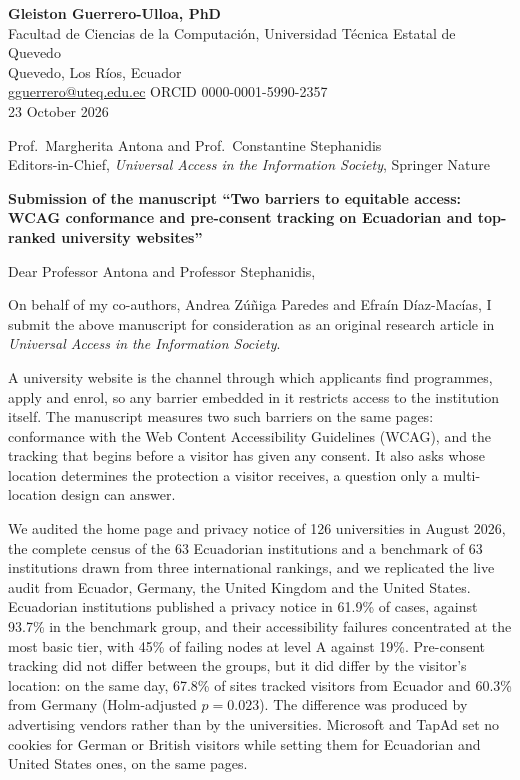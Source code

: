 \documentclass[11pt,a4paper]{article}
\begin{document}
\begin{flushright}
	\small
	{\color{uteq}\textbf{Gleiston Guerrero-Ulloa, PhD}}\\
	Facultad de Ciencias de la Computaci\'on, Universidad T\'ecnica Estatal de Quevedo\\
	Quevedo, Los R\'ios, Ecuador\\
	\href{mailto:gguerrero@uteq.edu.ec}{gguerrero@uteq.edu.ec} \quad ORCID 0000-0001-5990-2357\\[0.5em]
	23 October 2026
\end{flushright}

\vspace{0.1em}
Prof.\ Margherita Antona and Prof.\ Constantine Stephanidis\\
Editors-in-Chief, \textit{Universal Access in the Information Society}, Springer Nature

\vspace{0.1em}
\textbf{Submission of the manuscript ``Two barriers to equitable access: WCAG conformance and pre-consent tracking on Ecuadorian and top-ranked university websites''}

Dear Professor Antona and Professor Stephanidis,

On behalf of my co-authors, Andrea Z\'u\~niga Paredes and Efra\'in D\'iaz-Mac\'ias, I submit the above manuscript for consideration as an original research article in \textit{Universal Access in the Information Society}.

A university website is the channel through which applicants find programmes, apply and enrol, so any barrier embedded in it restricts access to the institution itself. The manuscript measures two such barriers on the same pages: conformance with the Web Content Accessibility Guidelines (WCAG), and the tracking that begins before a visitor has given any consent. It also asks whose location determines the protection a visitor receives, a question only a multi-location design can answer.

We audited the home page and privacy notice of 126 universities in August 2026, the complete census of the 63 Ecuadorian institutions and a benchmark of 63 institutions drawn from three international rankings, and we replicated the live audit from Ecuador, Germany, the United Kingdom and the United States. Ecuadorian institutions published a privacy notice in 61.9\% of cases, against 93.7\% in the benchmark group, and their accessibility failures concentrated at the most basic tier, with 45\% of failing nodes at level A against 19\%. Pre-consent tracking did not differ between the groups, but it did differ by the visitor's location: on the same day, 67.8\% of sites tracked visitors from Ecuador and 60.3\% from Germany (Holm-adjusted $p=0.023$). The difference was produced by advertising vendors rather than by the universities. Microsoft and TapAd set no cookies for German or British visitors while setting them for Ecuadorian and United States ones, on the same pages.
\end{document}
